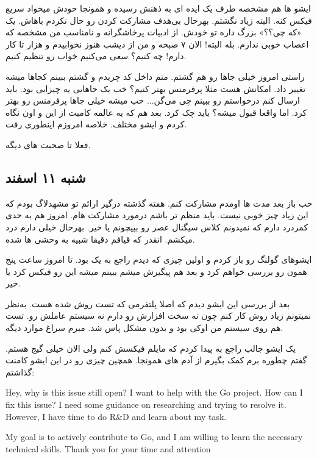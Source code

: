 ایشو ها هم مشخصه طرف یک ایده ای به ذهنش رسیده و همونجا خودش میخواد سریع فیکس کنه. البته زیاد نگشتم. بهرحال بی‌هدف
مشارکت کردن رو حال نکردم باهاش. یک «که‌ چی؟؟» بزرگ داره تو خودش. از ادبیات پرخاشگرانه و نامناسب من مشخصه که اعصاب خوبی ندارم.
بله البته! الان ۷ صبحه و من از دیشب هنوز نخوابیدم و هزار تا کار دارم! چه کنیم؟ سعی می‌کنیم خواب رو تنظیم کنیم.

راستی امروز خیلی جاها رو هم گشتم. منم داخل کد چریدم و گشتم ببینم کجاها میشه تغییر داد. امکانش هست مثلا پرفرمنس بهتر کنیم؟
خب یک جاهایی یه چیزایی بود. باید ارسال کنم درخواستم رو ببینم چی می‌گن... خب میشه خیلی جاها پرفرمنس رو بهتر کرد. اما واقعا قبول میشه؟
باید چک کرد. بعد هم که یه عالمه کامیت از این و اون نگاه کردم و ایشو مختلف. خلاصه امروزم اینطوری رفت.

فعلا تا صحبت های دیگه.

\subsection{شنبه ۱۱ اسفند}
خب باز بعد مدت ها اومدم مشارکت کنم. هفته گذشته درگیر ارائم تو مشهدلاگ بودم که این زیاد چیز خوبی نیست. باید منظم تر باشم
درمورد مشارکت هام. امروز هم به حدی کمردرد دارم که نمیدونم کلاس سیگنال عصر رو بپیچونم یا خیر. بهرحال خیلی دارم درد میکشم. انقدر که
قیافم دقیقا شبیه به وحشی ها شده.

ایشوهای گولنگ رو باز کردم و اولین چیزی که دیدم راجع به یک  بود.
تا امروز ساعت پنج همون رو بررسی خواهم کرد و بعد هم پیگیرش
میشم ببینم میشه این رو فیکس کرد یا خیر.

بعد از بررسی این ایشو دیدم که اصلا پلتفرمی که تست روش  شده  هست. به‌نظر نمیتونم زیاد روش کار کنم چون نه
سخت افزارش رو دارم نه سیستم عاملش رو. تست هم روی سیستم من اوکی بود و بدون مشکل پاس شد. میرم سراغ موارد دیگه.

یک ایشو جالب
راجع به  پیدا کردم که مایلم فیکسش کنم ولی الان خیلی گیج هستم. گفتم چطوره برم کمک بگیرم از آدم های همونجا.
همچین چیزی رو در این ایشو کامنت گذاشتم:

\begin{latin}
Hey, why is this issue still open? I want to help with the Go project. How can I fix this issue?
I need some guidance on researching and trying to resolve it. However, I have time to do R\&D and learn about my task.

My goal is to actively contribute to Go, and I am willing to learn the necessary technical skills. Thank you for your time and attention
\end{latin}

